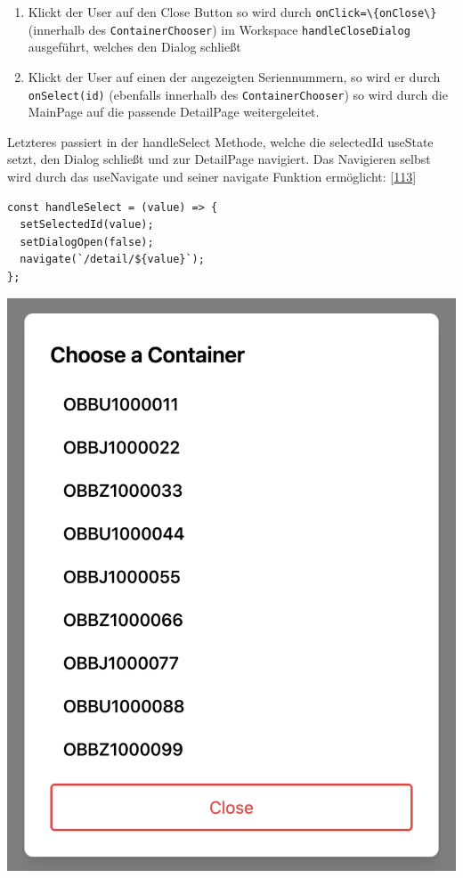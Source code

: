 \documentclass[
    headings=optiontotocandhead,%
    twoside,
    numbers=noenddot,%
    12pt, %
    titlepage, %
    parskip=full, %
    listof=leveldown, 
    numbers=noenddot, %
    a4paper,DIV=14,
    BCOR=15mm,
]{scrbook}
\newcommand{\passthrough}[1]{#1}
\let\origfigure=\figure
\let\endorigfigure=\endfigure
\renewenvironment{figure}[1][]{%
   \origfigure[H]
}{%
   \endorigfigure
}
\providecommand{\tightlist}{%
  \setlength{\itemsep}{0pt}\setlength{\parskip}{0pt}}
\begin{document}
\begin{enumerate}
\def\labelenumi{\arabic{enumi}.}
\tightlist
\item
  Klickt der User auf den Close Button so wird durch
  \passthrough{\lstinline!onClick=\{onClose\}!} (innerhalb des
  \passthrough{\lstinline!ContainerChooser!}) im Workspace
  \passthrough{\lstinline!handleCloseDialog!} ausgeführt, welches den
  Dialog schließt
\item
  Klickt der User auf einen der angezeigten Seriennummern, so wird er
  durch \passthrough{\lstinline!onSelect(id)!} (ebenfalls innerhalb des
  \passthrough{\lstinline!ContainerChooser!}) so wird durch die MainPage
  auf die passende DetailPage weitergeleitet.
\end{enumerate}

Letzteres passiert in der handleSelect Methode, welche die selectedId
useState setzt, den Dialog schließt und zur DetailPage navigiert. Das
Navigieren selbst wird durch das useNavigate und seiner navigate
Funktion ermöglicht:
{[}\protect\hyperlink{ref-GeeksForGeeks-useNavigate}{113}{]}

\begin{lstlisting}[caption={handleSelect Methode}]
const handleSelect = (value) => {
  setSelectedId(value);
  setDialogOpen(false);
  navigate(`/detail/${value}`);
};
\end{lstlisting}

\begin{figure}
\centering
\includegraphics{img/Gekle/ContainerChooserExample.png}
\caption{ContainerChooser Dialog mit 9 Containern}
\end{figure}
\end{document}
